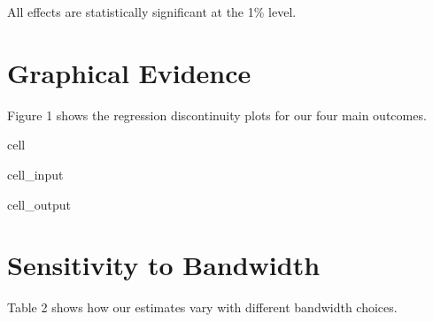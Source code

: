 \documentclass[letterpaper,10pt,english]{jupyterBook}
\begin{document}
\sphinxAtStartPar
All effects are statistically significant at the 1\% level.


\section{Graphical Evidence}
\label{\detokenize{results:graphical-evidence}}
\sphinxAtStartPar
Figure 1 shows the regression discontinuity plots for our four main outcomes.

\begin{sphinxuseclass}{cell}\begin{sphinxVerbatimInput}

\begin{sphinxuseclass}{cell_input}
\begin{sphinxVerbatim}[commandchars=\\\{\}]
  
\end{sphinxVerbatim}

\end{sphinxuseclass}\end{sphinxVerbatimInput}
\begin{sphinxVerbatimOutput}

\begin{sphinxuseclass}{cell_output}
\noindent{}

\end{sphinxuseclass}\end{sphinxVerbatimOutput}

\end{sphinxuseclass}

\section{Sensitivity to Bandwidth}
\label{\detokenize{results:sensitivity-to-bandwidth}}
\sphinxAtStartPar
Table 2 shows how our estimates vary with different bandwidth choices.
\end{document}
